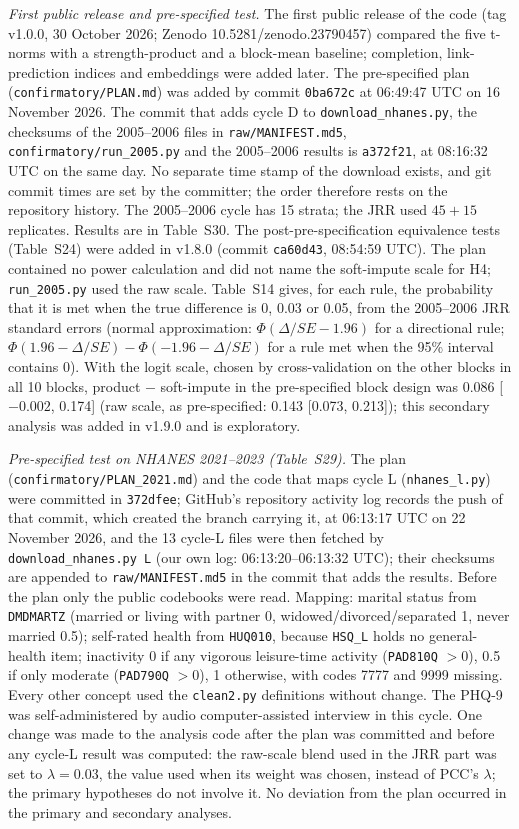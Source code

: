 \documentclass[journal]{IEEEtran}
\begin{document}
\emph{First public release and pre-specified test.} The first public release of the code (tag v1.0.0, 30 October 2026; Zenodo 10.5281/zenodo.23790457) compared the five t-norms with a strength-product and a block-mean baseline; completion, link-prediction indices and embeddings were added later. The pre-specified plan (\texttt{confirmatory/PLAN.md}) was added by commit \texttt{0ba672c} at 06:49:47 UTC on 16 November 2026. The commit that adds cycle D to \texttt{download\_nhanes.py}, the checksums of the 2005--2006 files in \texttt{raw/MANIFEST.md5}, \texttt{confirmatory/run\_2005.py} and the 2005--2006 results is \texttt{a372f21}, at 08:16:32 UTC on the same day. No separate time stamp of the download exists, and git commit times are set by the committer; the order therefore rests on the repository history. The 2005--2006 cycle has 15 strata; the JRR used $45+15$ replicates. Results are in Table~S30. The post-pre-specification equivalence tests (Table~S24) were added in v1.8.0 (commit \texttt{ca60d43}, 08:54:59 UTC). The plan contained no power calculation and did not name the soft-impute scale for H4; \texttt{run\_2005.py} used the raw scale. Table~S14 gives, for each rule, the probability that it is met when the true difference is 0, 0.03 or 0.05, from the 2005--2006 JRR standard errors (normal approximation: $\Phi(\Delta/SE-1.96)$ for a directional rule; $\Phi(1.96-\Delta/SE)-\Phi(-1.96-\Delta/SE)$ for a rule met when the 95\% interval contains 0). With the logit scale, chosen by cross-validation on the other blocks in all 10 blocks, product $-$ soft-impute in the pre-specified block design was 0.086 [$-0.002$, 0.174] (raw scale, as pre-specified: 0.143 [0.073, 0.213]); this secondary analysis was added in v1.9.0 and is exploratory.

\emph{Pre-specified test on NHANES 2021--2023 (Table~S29).} The plan (\texttt{confirmatory/PLAN\_2021.md}) and the code that maps cycle L (\texttt{nhanes\_l.py}) were committed in \texttt{372dfee}; GitHub's repository activity log records the push of that commit, which created the branch carrying it, at 06:13:17 UTC on 22 November 2026, and the 13 cycle-L files were then fetched by \texttt{download\_nhanes.py L} (our own log: 06:13:20--06:13:32 UTC); their checksums are appended to \texttt{raw/MANIFEST.md5} in the commit that adds the results. Before the plan only the public codebooks were read. Mapping: marital status from \texttt{DMDMARTZ} (married or living with partner 0, widowed/divorced/separated 1, never married 0.5); self-rated health from \texttt{HUQ010}, because \texttt{HSQ\_L} holds no general-health item; inactivity 0 if any vigorous leisure-time activity (\texttt{PAD810Q} $>0$), 0.5 if only moderate (\texttt{PAD790Q} $>0$), 1 otherwise, with codes 7777 and 9999 missing. Every other concept used the \texttt{clean2.py} definitions without change. The PHQ-9 was self-administered by audio computer-assisted interview in this cycle. One change was made to the analysis code after the plan was committed and before any cycle-L result was computed: the raw-scale blend used in the JRR part was set to $\lambda=0.03$, the value used when its weight was chosen, instead of PCC's $\lambda$; the primary hypotheses do not involve it. No deviation from the plan occurred in the primary and secondary analyses.
\end{document}
